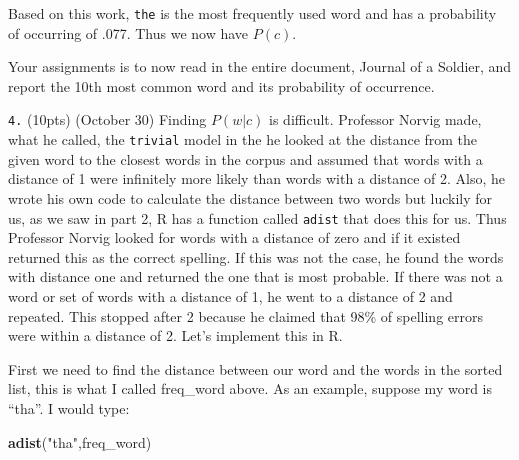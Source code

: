 \documentclass[]{book}
\newenvironment{Shaded}{\begin{snugshade}}{\end{snugshade}}
\newcommand{\KeywordTok}[1]{\textcolor[rgb]{0.13,0.29,0.53}{\textbf{#1}}}
\newcommand{\StringTok}[1]{\textcolor[rgb]{0.31,0.60,0.02}{#1}}
\newcommand{\NormalTok}[1]{#1}
\theoremstyle{definition}
\theoremstyle{definition}
\theoremstyle{definition}
\theoremstyle{remark}
\begin{document}
Based on this work, \texttt{the} is the most frequently used word and
has a probability of occurring of .077. Thus we now have \(P(c)\).

Your assignments is to now read in the entire document, Journal of a
Soldier, and report the 10th most common word and its probability of
occurrence.

\texttt{4.} (10pts) (October 30) Finding \(P(w|c)\) is difficult.
Professor Norvig made, what he called, the \texttt{trivial} model in the
he looked at the distance from the given word to the closest words in
the corpus and assumed that words with a distance of 1 were infinitely
more likely than words with a distance of 2. Also, he wrote his own code
to calculate the distance between two words but luckily for us, as we
saw in part 2, R has a function called \texttt{adist} that does this for
us. Thus Professor Norvig looked for words with a distance of zero and
if it existed returned this as the correct spelling. If this was not the
case, he found the words with distance one and returned the one that is
most probable. If there was not a word or set of words with a distance
of 1, he went to a distance of 2 and repeated. This stopped after 2
because he claimed that 98\% of spelling errors were within a distance
of 2. Let's implement this in R.

First we need to find the distance between our word and the words in the
sorted list, this is what I called freq\_word above. As an example,
suppose my word is ``tha''. I would type:

\begin{Shaded}
\begin{Highlighting}[]
\KeywordTok{adist}\NormalTok{(}\StringTok{"tha"}\NormalTok{,freq_word)}
\end{Highlighting}
\end{Shaded}
\end{document}
